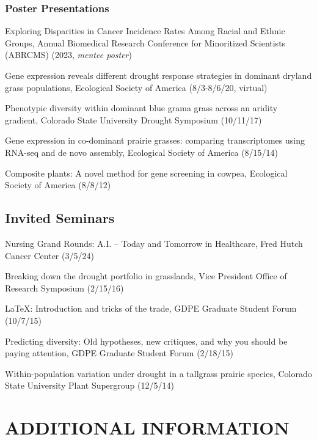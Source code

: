 \documentclass{cv}
\begin{document}
\subsubsection*{Poster Presentations}

Exploring Disparities in Cancer Incidence Rates Among Racial and Ethnic Groups, Annual Biomedical Research Conference for Minoritized Scientists (ABRCMS) (2023, \textit{mentee poster})

Gene expression reveals different drought response strategies in dominant dryland grass populations, Ecological Society of America (8/3-8/6/20, virtual)

Phenotypic diversity within dominant blue grama grass across an aridity gradient, Colorado State University Drought Symposium (10/11/17)

Gene expression in co-dominant prairie grasses: comparing transcriptomes using RNA-seq and de novo assembly, Ecological Society of America (8/15/14)

Composite plants: A novel method for gene screening in cowpea, Ecological Society of America (8/8/12)

\subsection*{Invited Seminars}

Nursing Grand Rounds: A.I. – Today and Tomorrow in Healthcare, Fred Hutch Cancer Center (3/5/24)

Breaking down the drought portfolio in grasslands, Vice President Office of Research Symposium (2/15/16)

\LaTeX: Introduction and tricks of the trade, GDPE Graduate Student Forum (10/7/15)

Predicting diversity: Old hypotheses, new critiques, and why you should be paying attention, GDPE Graduate Student Forum (2/18/15)

Within-population variation under drought in a tallgrass prairie species, Colorado State University Plant Supergroup (12/5/14)


\section*{ADDITIONAL INFORMATION}
\end{document}
